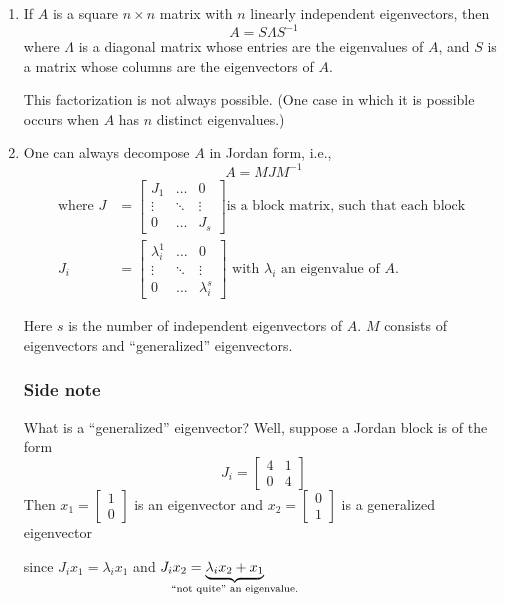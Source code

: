 \begin{enumerate}[label=(\roman*)]
\item If $A$ is a square $n\times n$ matrix with $n$ linearly independent eigenvectors, then
    $$A = S\Lambda S^{-1}$$
    where $\Lambda$ is a diagonal matrix whose entries are the eigenvalues of $A$, and $S$ is a matrix whose columns are the eigenvectors of $A$.
    
    This factorization is not always possible. (One case in which it is possible occurs when $A$ has $n$ distinct eigenvalues.)

\item One can always decompose $A$ in Jordan form, i.e.,
    $$A = MJM^{-1}$$
    \begin{align*}
        \text{where }J &= 
    \begin{bmatrix}
        J_1 & \dots & 0 \\
        \vdots & \ddots & \vdots \\
        0 & \dots & J_s
    \end{bmatrix}
    \text{is a block matrix, such that each block }\\
    J_i &= 
    \begin{bmatrix}
        \lambda_i^1 & \dots & 0 \\
        \vdots & \ddots & \vdots \\
        0 & \dots & \lambda_i^s
    \end{bmatrix}
    \text{ with $\lambda_i$ an eigenvalue of $A$.}
    \end{align*}
    
    Here $s$ is the number of independent eigenvectors of $A$. $M$ consists of eigenvectors and ``generalized'' eigenvectors.
    
    \subsubsection*{Side note}
    
    What is a ``generalized'' eigenvector?
    Well, suppose a Jordan block is of the form 
    \[J_i = \begin{bmatrix}4 & 1 \\ 0 & 4\end{bmatrix} \tag*{($\lambda_i = 4$)} \]
    Then $x_1 = \begin{bmatrix} 1 \\ 0 \end{bmatrix}$ is an eigenvector
    and $x_2 = \begin{bmatrix} 0 \\ 1 \end{bmatrix}$ is a generalized eigenvector
    
    since $J_i x_1 = \lambda_i x_1$ and 
    $J_i x_2 = \underbrace{\lambda_i x_2 + x_1}_{\mathclap{\text{``not quite'' an eigenvalue.}}}$
\end{enumerate}

